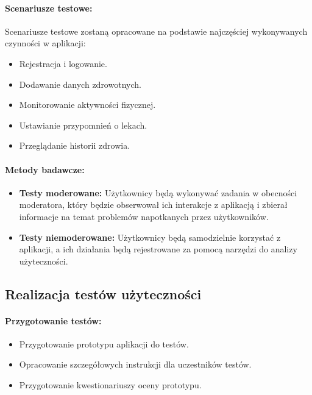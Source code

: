 \paragraph{Scenariusze testowe:} Scenariusze testowe zostaną opracowane na podstawie najczęściej wykonywanych czynności w aplikacji:
\begin{itemize}
  \item Rejestracja i logowanie.
  \item Dodawanie danych zdrowotnych.
  \item Monitorowanie aktywności ﬁzycznej.
  \item Ustawianie przypomnień o lekach.
  \item Przeglądanie historii zdrowia.
\end{itemize}

\paragraph{Metody badawcze:} 
\begin{itemize}
  \item \textbf{Testy moderowane:} Użytkownicy będą wykonywać zadania w obecności moderatora, który będzie obserwował ich interakcje z aplikacją i zbierał informacje na temat problemów napotkanych przez użytkowników.
  \item \textbf{Testy niemoderowane:} Użytkownicy będą samodzielnie korzystać z aplikacji, a ich działania będą rejestrowane za pomocą narzędzi do analizy użyteczności.
\end{itemize}

\begin{center}
  \subsection{Realizacja testów użyteczności}
\end{center}

\paragraph{Przygotowanie testów:}
\begin{itemize}
  \item Przygotowanie prototypu aplikacji do testów.
  \item Opracowanie szczegółowych instrukcji dla uczestników testów.
  \item Przygotowanie kwestionariuszy oceny prototypu.
\end{itemize}

